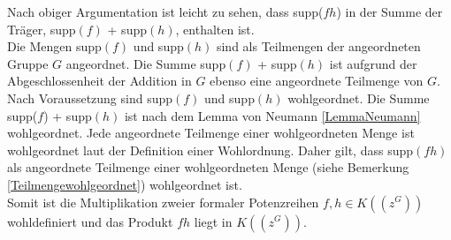 {Nach obiger Argumentation ist leicht zu sehen, dass supp($fh$) in der Summe der Träger, supp$(f)$ + supp$(h)$, enthalten ist. \\ 
Die Mengen supp$(f)$ und supp$(h)$ sind als Teilmengen der angeordneten Gruppe $G$ angeordnet. Die Summe supp$(f)$ + supp$(h)$ ist aufgrund der Abgeschlossenheit der Addition in $G$ ebenso eine angeordnete Teilmenge von $G$. 
Nach Voraussetzung sind supp$(f)$ und supp$(h)$ wohlgeordnet. Die Summe supp($f$) + supp$(h)$ ist nach dem Lemma von Neumann \ref{LemmaNeumann} wohlgeordnet. Jede angeordnete Teilmenge einer wohlgeordneten Menge ist wohlgeordnet laut der Definition einer Wohlordnung. Daher gilt, dass supp$(fh)$ als angeordnete Teilmenge einer wohlgeordneten Menge (siehe Bemerkung \ref{Teilmengewohlgeordnet}) wohlgeordnet ist. \\
Somit ist die Multiplikation zweier formaler Potenzreihen $f,h \in K\left(\left(z^G\right)\right)$ wohldefiniert und das Produkt $fh$ liegt in $K\left(\left(z^G\right)\right)$.



}
